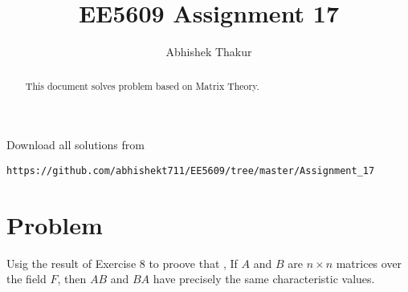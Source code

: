 \documentclass[journal,12pt,twocolumn]{IEEEtran}
\begin{document}
     \def\rightbox#1{\makebox[0in][r]{#1}}
     \def\centbox#1{\makebox[0in]{#1}}
     \def\topbox#1{\raisebox{-\baselineskip}[0in][0in]{#1}}
     \def\midbox#1{\raisebox{-0.5\baselineskip}[0in][0in]{#1}}
\vspace{3cm}
\title{EE5609 Assignment 17}
\author{Abhishek Thakur}
\maketitle
\newpage
\bigskip
\renewcommand{\thefigure}{\theenumi}
\renewcommand{\thetable}{\theenumi}
\begin{abstract}
This document solves problem based on Matrix Theory.
\end{abstract}
Download all solutions from 
\begin{lstlisting}
https://github.com/abhishekt711/EE5609/tree/master/Assignment_17
\end{lstlisting}
\section{Problem}
Usig the result of Exercise 8 to proove that , If $A$ and $B$ are $n \times n$ matrices over the field $F$, then $AB$ and $BA$ have precisely the same characteristic values.
\end{document}
